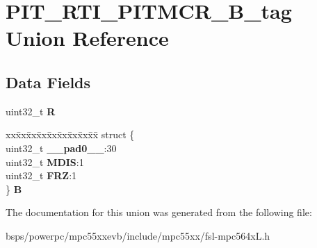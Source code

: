 \hypertarget{unionPIT__RTI__PITMCR__32B__tag}{}\section{P\+I\+T\+\_\+\+R\+T\+I\+\_\+\+P\+I\+T\+M\+C\+R\+\_\+B\+\_\+tag Union Reference}
\label{unionPIT__RTI__PITMCR__32B__tag}
\subsection*{Data Fields}
\begin{DoxyCompactItemize}
\item 
\mbox{\label{unionPIT__RTI__PITMCR__32B__tag_a7fe6b0ba50a0af8a3f55f5fc0270cd68}} 
uint32\+\_\+t {\bfseries R}
\item 
\mbox{\label{unionPIT__RTI__PITMCR__32B__tag_a53e28275637f17f898289bd58e259522}} 
\begin{tabbing}
xx\=xx\=xx\=xx\=xx\=xx\=xx\=xx\=xx\=\kill
struct \{\\
\>uint32\_t {\bfseries \_\_pad0\_\_}:30\\
\>uint32\_t {\bfseries MDIS}:1\\
\>uint32\_t {\bfseries FRZ}:1\\
\} {\bfseries B}\\

\end{tabbing}\end{DoxyCompactItemize}


The documentation for this union was generated from the following file\+:\begin{DoxyCompactItemize}
\item 
bsps/powerpc/mpc55xxevb/include/mpc55xx/fsl-\/mpc564x\+L.\+h\end{DoxyCompactItemize}
